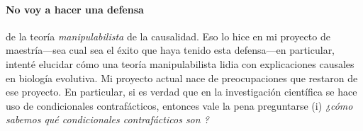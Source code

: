 







\paragraph{No voy a hacer una defensa} de la teoría
\emph{manipulabilista} de la causalidad. Eso lo hice en mi
proyecto de maestría---sea cual sea el éxito que haya tenido
esta defensa---en particular, intenté elucidar cómo una
teoría manipulabilista lidia con explicaciones causales en
biología evolutiva. Mi proyecto actual nace de
preocupaciones que restaron de ese proyecto. En particular,
si es verdad que en la investigación científica se hace uso
de condicionales contrafácticos, entonces vale la pena
preguntarse (i) \emph{¿cómo sabemos qué condicionales
contrafácticos son ?}

